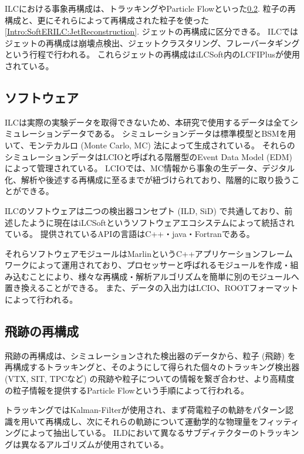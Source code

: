 ILCにおける事象再構成は、トラッキングやParticle Flowといった\ref{Intro:SoftERILC:ParticleReconstruction}. 粒子の再構成と、更にそれらによって再構成された粒子を使った\ref{Intro:SoftERILC:JetReconstruction}. ジェットの再構成に区分できる。
ILCではジェットの再構成は崩壊点検出、ジェットクラスタリング、フレーバータギングという行程で行われる。
これらジェットの再構成はiLCSoft内のLCFIPlus\cite{LCFIPlus}が使用されている。


\subsection{ソフトウェア} \label{Intro:SoftERILC:Software}

ILCは実際の実験データを取得できないため、本研究で使用するデータは全てシミュレーションデータである。
シミュレーションデータは標準模型とBSMを用いて、モンテカルロ (Monte Carlo, MC) 法によって生成されている。
それらのシミュレーションデータはLCIOと呼ばれる階層型のEvent Data Model (EDM) によって管理されている。
LCIOでは、MC情報から事象の生データ、デジタル化、解析や後述する再構成に至るまでが紐づけられており、階層的に取り扱うことができる。

ILCのソフトウェアは二つの検出器コンセプト (ILD, SiD) で共通しており、前述したように現在はiLCSoftというソフトウェアエコシステムによって統括されている。
提供されているAPIの言語はC++・java・Fortranである。

それらソフトウェアモジュールはMarlin\cite{Marlinpaper}というC++アプリケーションフレームワークによって運用されており、プロセッサーと呼ばれるモジュールを作成・組み込むことにより、様々な再構成・解析アルゴリズムを簡単に別のモジュールへ置き換えることができる。
また、データの入出力はLCIO、ROOTフォーマットによって行われる。


\subsection{飛跡の再構成} \label{Intro:SoftERILC:ParticleReconstruction}

飛跡の再構成は、シミュレーションされた検出器のデータから、粒子 (飛跡) を再構成するトラッキングと、そのようにして得られた個々のトラッキング検出器 (VTX, SIT, TPCなど) の飛跡や粒子についての情報を繋ぎ合わせ、より高精度の粒子情報を提供するParticle Flowという手順によって行われる。

トラッキングではKalman-Filterが使用され、まず荷電粒子の軌跡をパターン認識を用いて再構成し、次にそれらの軌跡について運動学的な物理量をフィッティングによって抽出している。
ILDにおいて異なるサブディテクターのトラッキングは異なるアルゴリズムが使用されている。


